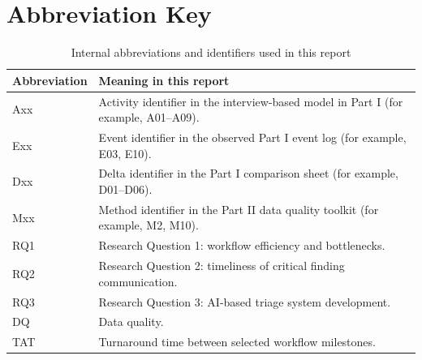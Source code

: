 \section*{Abbreviation Key}
\label{sec:abbreviation_key}

\begin{table}[H]
\centering
\footnotesize
\caption{Internal abbreviations and identifiers used in this report}
\label{tab:abbreviation_key}
\begin{tabularx}{\textwidth}{>{\raggedright\arraybackslash}p{} X}
\toprule
Abbreviation & Meaning in this report \\
\midrule
Axx & Activity identifier in the interview-based model in Part I (for example, A01--A09). \\
Exx & Event identifier in the observed Part I event log (for example, E03, E10). \\
Dxx & Delta identifier in the Part I comparison sheet (for example, D01--D06). \\
Mxx & Method identifier in the Part II data quality toolkit (for example, M2, M10). \\
RQ1 & Research Question 1: workflow efficiency and bottlenecks. \\
RQ2 & Research Question 2: timeliness of critical finding communication. \\
RQ3 & Research Question 3: AI-based triage system development. \\
DQ & Data quality. \\
TAT & Turnaround time between selected workflow milestones. \\
\bottomrule
\end{tabularx}
\end{table}
